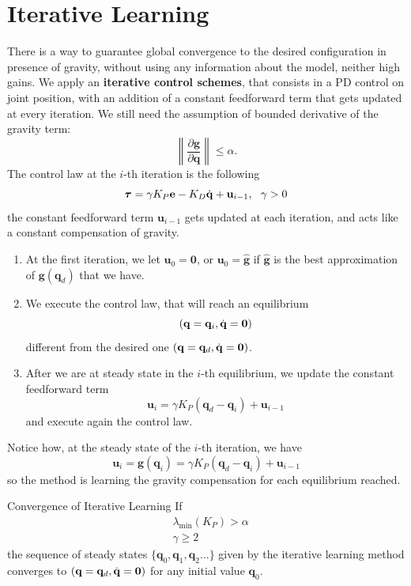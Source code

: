 \documentclass[10pt, a4paper]{report}
\newcommand{\q}{{\mathbf q}}
\begin{document}
\section{Iterative Learning}
There is a way to guarantee global convergence to the desired configuration in presence of gravity, without using any information about the model, neither high gains. We apply an \textbf{iterative control schemes}, that consists in a PD control on joint position, with an addition of a constant feedforward term that gets updated at every iteration. We still need the assumption of bounded derivative of the gravity term:\begin{equation}
    \left\|\frac{\partial\mathbf g}{\partial\q}\right\|\le \alpha.
\end{equation}
The control law at the $i$-th iteration is the following\begin{equation}
    {\boldsymbol{\tau}}=\gamma K_P\mathbf e-K_D{\dot{\mathbf q}}+\mathbf u_{i-1}, \ \ \gamma > 0 
\end{equation}
the constant feedforward term $\mathbf u_{i-1}$ gets updated at each iteration, and acts like a constant compensation of gravity. \begin{enumerate}
    \item At the first iteration, we let $\mathbf u_0=\mathbf 0$, or  $\mathbf u_0=\hat {\mathbf g}$ if $\hat {\mathbf g}$ is the best approximation of $\mathbf g(\q_d)$ that we have.
    \item We execute the control law, that will reach an equilibrium $$ (\q=\q_i, \dq=\mathbf 0)$$
    different from the desired one $(\q=\q_d, \dq=\mathbf 0)$. 
    \item After we are at steady state in the $i$-th equilibrium, we update the constant feedforward term\begin{equation}
        \mathbf u_i=\gamma K_P(\q_d-\q_i)+\mathbf u_{i-1}
    \end{equation}
    and execute again the control law.
\end{enumerate}
Notice how, at the steady state of the $i$-th iteration, we have\begin{equation}
    \mathbf u_i=\mathbf g(\q_i)=\gamma K_P(\q_d-\q_i)+\mathbf u_{i-1}
\end{equation}
so the method is learning the gravity compensation for each equilibrium reached.\begin{boxtheorem}{Convergence of Iterative Learning}{}
    If\begin{align}
        &\lambda_{\text{min}}(K_P)>\alpha\label{a}\\
        &\gamma\ge 2\label{b}
    \end{align}
    the sequence of steady states $\{\q_0,\q_1,\q_2\dots\}$ given by the iterative learning method converges to $(\q=\q_d,\dq=\mathbf 0)$ for any initial value $\q_0$.
\end{boxtheorem}
\end{document}
